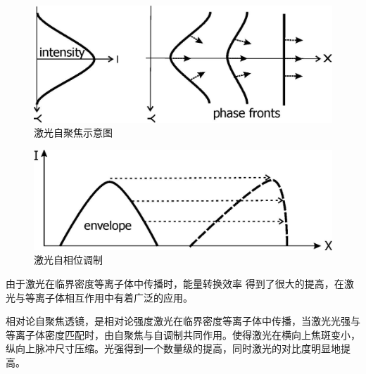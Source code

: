 \begin{figure}[!htbp]
  \centering
  \includegraphics[width=\MyFactor\textwidth]{Img/selffocussing.eps}
  \caption{激光自聚焦示意图}
  \label{fig:selffousing}
\end{figure}

\begin{figure}[!htbp]
  \centering
  \includegraphics[width=\MyFactor\textwidth]{Img/prof-steepening.eps}
  \caption{激光自相位调制}
  \label{fig:phaseModulate}
\end{figure}

由于激光在临界密度等离子体中传播时，能量转换效率 得到了很大的提高，在激光与等离子体相互作用中有着广泛的应用。



 相对论自聚焦透镜\cite{wang2011laser}，是相对论强度激光在临界密度等离子体中传播，当激光光强与等离子体密度匹配时，由自聚焦与自调制共同作用。使得激光在横向上焦斑变小，纵向上脉冲尺寸压缩。光强得到一个数量级的提高，同时激光的对比度明显地提高。


